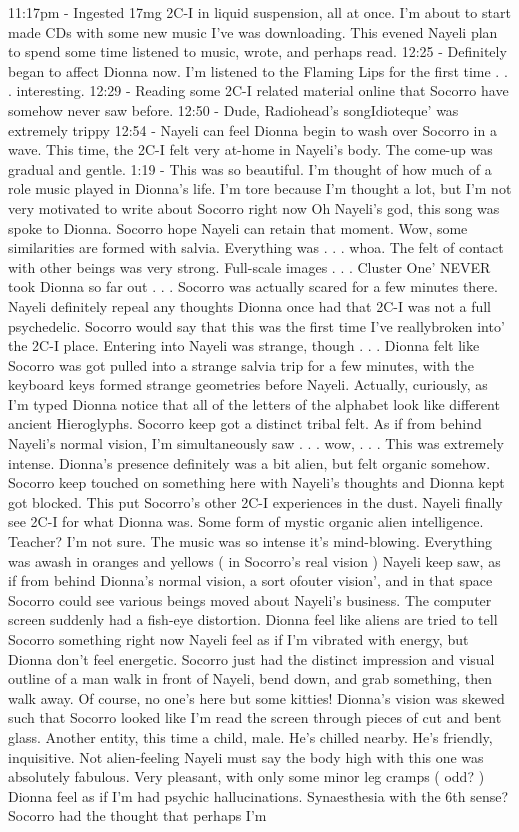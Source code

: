 \documentclass[12pt]{book}
\begin{document}
11:17pm - Ingested 17mg 2C-I in liquid suspension, all at once. I'm about to start made CDs with some new music I've was downloading. This evened Nayeli plan to spend some time listened to music, wrote, and perhaps read. 12:25 - Definitely began to affect Dionna now. I'm listened to the Flaming Lips for the first time . . .  interesting. 12:29 - Reading some 2C-I related material online that Socorro have somehow never saw before. 12:50 - Dude, Radiohead's songIdioteque' was extremely trippy 12:54 - Nayeli can feel Dionna begin to wash over Socorro in a wave. This time, the 2C-I felt very at-home in Nayeli's body. The come-up was gradual and gentle. 1:19 - This was so beautiful. I'm thought of how much of a role music played in Dionna's life. I'm tore because I'm thought a lot, but I'm not very motivated to write about Socorro right now Oh Nayeli's god, this song was spoke to Dionna. Socorro hope Nayeli can retain that moment. Wow, some similarities are formed with salvia. Everything was  . . .  whoa. The felt of contact with other beings was very strong. Full-scale images  . . . Cluster One' NEVER took Dionna so far out . . .  Socorro was actually scared for a few minutes there. Nayeli definitely repeal any thoughts Dionna once had that 2C-I was not a full psychedelic. Socorro would say that this was the first time I've reallybroken into' the 2C-I place. Entering into Nayeli was strange, though . . .  Dionna felt like Socorro was got pulled into a strange salvia trip for a few minutes, with the keyboard keys formed strange geometries before Nayeli. Actually, curiously, as I'm typed Dionna notice that all of the letters of the alphabet look like different ancient Hieroglyphs. Socorro keep got a distinct tribal felt. As if from behind Nayeli's normal vision, I'm simultaneously saw  . . .  wow,  . . .  This was extremely intense. Dionna's presence definitely was a bit alien, but felt organic somehow. Socorro keep touched on something here with Nayeli's thoughts and Dionna kept got blocked. This put Socorro's other 2C-I experiences in the dust. Nayeli finally see 2C-I for what Dionna was. Some form of mystic organic alien intelligence. Teacher? I'm not sure. The music was so intense it's mind-blowing. Everything was awash in oranges and yellows ( in Socorro's real vision ) Nayeli keep saw, as if from behind Dionna's normal vision, a sort ofouter vision', and in that space Socorro could see various beings moved about Nayeli's business. The computer screen suddenly had a fish-eye distortion. Dionna feel like aliens are tried to tell Socorro something right now Nayeli feel as if I'm vibrated with energy, but Dionna don't feel energetic. Socorro just had the distinct impression and visual outline of a man walk in front of Nayeli, bend down, and grab something, then walk away. Of course, no one's here but some kitties! Dionna's vision was skewed such that Socorro looked like I'm read the screen through pieces of cut and bent glass. Another entity, this time a child, male. He's chilled nearby. He's friendly, inquisitive. Not alien-feeling Nayeli must say the body high with this one was absolutely fabulous. Very pleasant, with only some minor leg cramps ( odd? ) Dionna feel as if I'm had psychic hallucinations. Synaesthesia with the 6th sense? Socorro had the thought that perhaps I'm 
\end{document}
